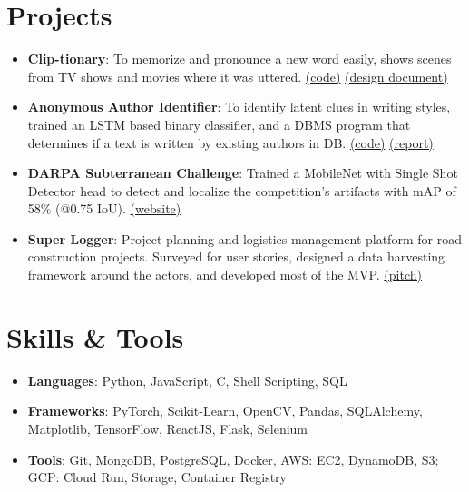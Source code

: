 \documentclass[letterpaper,11pt]{article}
\newcommand{\resumeItem}[2]{
  \item\small{
    \textbf{#1}{: #2 \vspace{-2pt}}
  }
}
\newcommand{\resumeSubItem}[2]{\resumeItem{#1}{#2}\vspace{-4pt}}
\newcommand{\resumeSubHeadingListStart}{\begin{itemize}[leftmargin=*]}
\newcommand{\resumeSubHeadingListEnd}{\end{itemize}}
\begin{document}
\section{Projects}
  \resumeSubHeadingListStart
    \resumeSubItem{Clip-tionary}
      {To memorize and pronounce a new word easily, shows scenes from TV shows and movies where it was uttered. \textcolor{MidnightBlue}{\href{https://github.com/RahulDamineni/tv-dict}{(code)} \href{https://github.com/RahulDamineni/tv-dict/blob/master/CS562_ProjectSketch.pdf}{(design document)}}}
    \resumeSubItem{Anonymous Author Identifier}
      {To identify latent clues in writing styles, trained an LSTM based binary classifier, and a DBMS program that determines if a text is written by existing authors in DB. \textcolor{MidnightBlue}{\href{https://github.com/RahulDamineni/anonymous_author_matcher}{(code)} \href{https://github.com/RahulDamineni/anonymous_author_matcher/blob/master/anon_author_identifier_report.pdf}{(report)}}}
    \resumeSubItem{DARPA Subterranean Challenge}
      {Trained a MobileNet with Single Shot Detector head to detect and localize the competition's artifacts with mAP of 58\% (@0.75 IoU). \textcolor{MidnightBlue}{\href{https://www.subt-explorer.com/}{(website)}}}
    \resumeSubItem{Super Logger}
      {Project planning and logistics management platform for road construction projects. Surveyed for user stories, designed a data harvesting framework around the actors, and developed most of the MVP. \textcolor{MidnightBlue}{\href{https://drive.google.com/file/d/1H9IJ4kVDP79thjI6kPTr0LBxHkd46nlo/view?usp=sharing}{(pitch)}}}
  \resumeSubHeadingListEnd


\vspace{-5pt}
\section{Skills \& Tools}
  \resumeSubHeadingListStart
    \item{
      \textbf{Languages}{: Python, JavaScript, C, Shell Scripting, SQL}
    }
    \item{
      \textbf{Frameworks}{: PyTorch, Scikit-Learn, OpenCV, Pandas, SQLAlchemy, Matplotlib, TensorFlow, ReactJS, Flask, Selenium}
    }
    \item{
      \textbf{Tools}{: Git, MongoDB, PostgreSQL, Docker, AWS: EC2, DynamoDB, S3; GCP: Cloud Run, Storage, Container Registry}
    }
  \resumeSubHeadingListEnd


\end{document}
